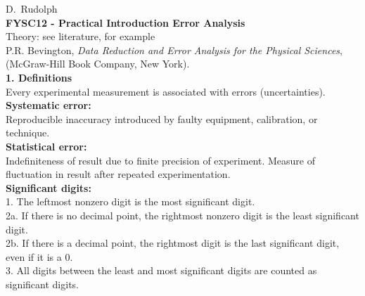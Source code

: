\documentclass[12pt]{article}
\begin{document}
\renewcommand{\rmdefault}{phv}
\renewcommand{\sup}[1]{$^{\footnotesize\textsl{#1}}$}
\newcommand{\su}[1]{$^{\footnotesize\textrm{#1}}$}
\renewcommand{\sb}[1]{$_{\footnotesize\textrm{#1}}$}
\newcommand{\sss}[2]{$^{\footnotesize\textsl{#1}}_{\footnotesize\textsl{#2}}$}
\newcommand{\susu}[2]{$^{\footnotesize\textrm{#1}}_{\footnotesize\textrm{#2}}$}
\newcommand{\WB}{{\bf WB}\\}
\normalsize\vspace*{-1cm}

D.~Rudolph\\

{\Large\bf FYSC12 - Practical Introduction Error Analysis}\\
Theory: see literature, for example\\
{\small P.R. Bevington, {\it Data Reduction and Error Analysis
for the Physical Sciences},\\ (McGraw-Hill Book Company, New York).}\\

{\large\bf 1. Definitions}\\
Every experimental measurement is associated with errors (uncertainties).\\
{\bf Systematic error:}\\
Reproducible inaccuracy introduced by faulty
equipment, calibration, or technique.\\ %
{\bf Statistical error:}\\
Indefiniteness of result due to finite precision
of experiment. Measure of fluctuation in result after repeated
experimentation.\\ %
{\bf Significant digits:}\\
\hspace*{1em}1. The leftmost nonzero digit is the most significant digit.\\
\hspace*{1em}2a. If there is no decimal point, the rightmost nonzero digit
is the least significant \hspace*{2em}digit.\\
\hspace*{1em}2b. If there is a decimal point, the rightmost digit
is the last significant digit,\\ \hspace*{2em}even if it is a 0.\\
\hspace*{1em}3. All digits between the least and most significant digits
are counted as significant \hspace*{2em}digits.\\
\end{document}
